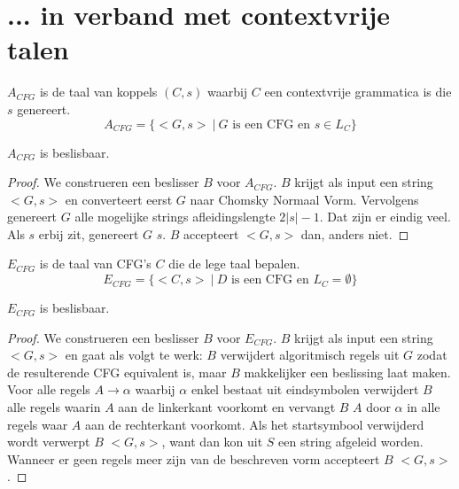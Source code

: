 \documentclass[main.tex]{subfiles}
\begin{document}

\section{... in verband met contextvrije talen}
\label{sec:verb-met-cont}

\begin{de}
  \label{de:a-cfg}
  $A_{CFG}$ is de taal van koppels $(C,s)$ waarbij $C$ een contextvrije grammatica is die $s$ genereert.
  \[ A_{CFG} = \{ <G,s> \ |\ G \text{ is een CFG en } s \in L_{C} \} \]
\end{de}

\begin{st}
  \label{st:a-cfg-besl}
  $A_{CFG}$ is beslisbaar.

  \begin{proof}
    We construeren een beslisser $B$ voor $A_{CFG}$.
    $B$ krijgt als input een string $<G,s>$ en converteert eerst $G$ naar Chomsky Normaal Vorm.
    Vervolgens genereert $G$ alle mogelijke strings afleidingslengte $2|s| - 1$.
    Dat zijn er eindig veel.
    Als $s$ erbij zit, genereert $G$ $s$.
    $B$ accepteert $<G,s>$ dan, anders niet.
  \end{proof}
\end{st}

\begin{de}
  \label{de:e-cfg}
  $E_{CFG}$ is de taal van CFG's $C$ die de lege taal bepalen.
  \[ E_{CFG} = \{ <C,s>\ |\ D \text{ is een CFG en } L_{C} = \emptyset \} \]
\end{de}

\begin{st}
  \label{st:e-cfg-besl}
  $E_{CFG}$ is beslisbaar.

  \begin{proof}
    We construeren een beslisser $B$ voor $E_{CFG}$.
    $B$ krijgt als input een string $<G,s>$ en gaat als volgt te werk:
    $B$ verwijdert algoritmisch regels uit $G$ zodat de resulterende CFG equivalent is, maar $B$ makkelijker een beslissing laat maken.
    Voor alle regels $A \rightarrow \alpha$ waarbij $\alpha$ enkel bestaat uit eindsymbolen verwijdert $B$ alle regels waarin $A$ aan de linkerkant voorkomt en vervangt $B$ $A$ door $\alpha$ in alle regels waar $A$ aan de rechterkant voorkomt.
    Als het startsymbool verwijderd wordt verwerpt $B$ $<G,s>$, want dan kon uit $S$ een string afgeleid worden.
    Wanneer er geen regels meer zijn van de beschreven vorm accepteert $B$ $<G,s>$.
  \end{proof}
\end{st}
\end{document}

